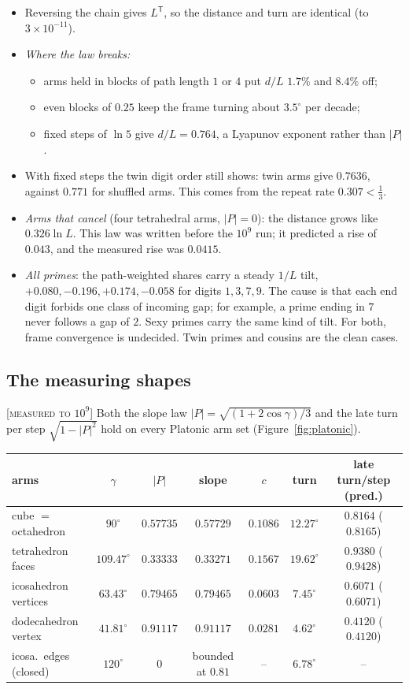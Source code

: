 \documentclass[11pt]{article}
\theoremstyle{definition}
\theoremstyle{remark}
\newcommand{\grade}[1]{\textsc{[#1]}}
\begin{document}
\begin{itemize}
\item Reversing the chain gives $L^{\mathsf T}$, so the distance and turn are identical (to $3\times10^{-11}$).
\item \emph{Where the law breaks:}
  \begin{itemize}
  \item arms held in blocks of path length $1$ or $4$ put $d/L$ $1.7\%$ and $8.4\%$ off;
  \item even blocks of $0.25$ keep the frame turning about $3.5^\circ$ per decade;
  \item fixed steps of $\ln5$ give $d/L=0.764$, a Lyapunov exponent rather than $|P|$.
  \end{itemize}
\item With fixed steps the twin digit order still shows: twin arms give $0.7636$, against $0.771$ for shuffled arms. This comes from the repeat rate $0.307<\tfrac13$.
\item \emph{Arms that cancel} (four tetrahedral arms, $|P|=0$): the distance grows like $0.326\ln L$. This law was written before the $10^9$ run; it predicted a rise of $0.043$, and the measured rise was $0.0415$.
\item \emph{All primes}: the path-weighted shares carry a steady $1/L$ tilt, $+0.080, -0.196, +0.174, -0.058$ for digits $1,3,7,9$. The cause is that each end digit forbids one class of incoming gap; for example, a prime ending in $7$ never follows a gap of $2$. Sexy primes carry the same kind of tilt. For both, frame convergence is undecided. Twin primes and cousins are the clean cases.
\end{itemize}

\subsection{The measuring shapes} \grade{measured to $10^9$}
Both the slope law $|P|=\sqrt{(1+2\cos\gamma)/3}$ and the late turn per step $\sqrt{1-|P|^2}$ hold on every Platonic arm set (Figure~\ref{fig:platonic}).

\begin{center}\footnotesize
\begin{tabular}{lcccccc}
\toprule
arms & $\gamma$ & $|P|$ & slope & $c$ & turn & late turn/step (pred.)\\
\midrule
cube $=$ octahedron & $90^\circ$ & $0.57735$ & $0.57729$ & $0.1086$ & $12.27^\circ$ & $0.8164$ ($0.8165$)\\
tetrahedron faces & $109.47^\circ$ & $0.33333$ & $0.33271$ & $0.1567$ & $19.62^\circ$ & $0.9380$ ($0.9428$)\\
icosahedron vertices & $63.43^\circ$ & $0.79465$ & $0.79465$ & $0.0603$ & $7.45^\circ$ & $0.6071$ ($0.6071$)\\
dodecahedron vertex & $41.81^\circ$ & $0.91117$ & $0.91117$ & $0.0281$ & $4.62^\circ$ & $0.4120$ ($0.4120$)\\
icosa.\ edges (closed) & $120^\circ$ & $0$ & bounded at $0.81$ & -- & $6.78^\circ$ & --\\
\bottomrule
\end{tabular}
\end{center}
\end{document}
